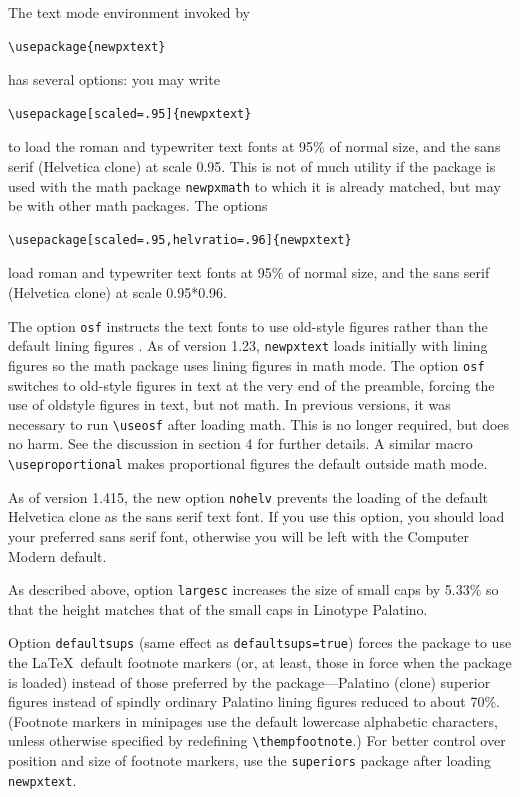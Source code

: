 \documentclass[11pt]{article}
\theoremstyle{oldplain}
\theoremstyle{plain}
\begin{document}
The text mode environment invoked by
\begin{verbatim}
\usepackage{newpxtext}
\end{verbatim}
has several options: you may write
\begin{verbatim}
\usepackage[scaled=.95]{newpxtext}
\end{verbatim}
to load the roman and typewriter text fonts at 95\% of normal size, and the sans serif (\textsf{Helvetica} clone) at scale 0.95. This is not of much utility if the package is used with the math package {\tt newpxmath} to which it is already matched, but may be with other math packages. The options
\begin{verbatim}
\usepackage[scaled=.95,helvratio=.96]{newpxtext}
\end{verbatim}
load roman and typewriter text fonts at 95\% of normal size, and the sans serif (\textsf{Helvetica} clone) at scale 0.95*0.96.

The option \texttt{osf} instructs the text fonts to use old-style figures  rather than the default lining figures . As of version 1.23, {\tt newpxtext} loads initially with lining figures so the math package uses lining figures in math mode. The option {\tt osf} switches to old-style figures in text at the very end of the preamble, forcing the use of oldstyle figures in text, but not math. In previous versions, it was necessary to run 
\verb|\useosf| after loading math. This is no longer required, but does no harm. See the discussion in section 4 for further details. A similar macro \verb|\useproportional| makes proportional figures the default outside math mode. 

As of version 1.415, the new option {\tt nohelv} prevents the loading of the default Helvetica clone as the sans serif text font. If you use this option, you should load your preferred sans serif font, otherwise you will be left with the Computer Modern default.

As described above, option {\tt largesc} increases the size of small caps by  5.33\% so that the height matches that of the small caps in Linotype Palatino.

Option {\tt defaultsups} (same effect as {\tt defaultsups=true}) forces the package to use the \LaTeX\ default footnote markers (or, at least, those in force when the package is loaded) instead of those preferred by the package---Palatino (clone) superior figures instead of spindly ordinary Palatino lining figures reduced to about 70\%. (Footnote markers in minipages use the default lowercase alphabetic characters, unless otherwise specified by redefining \verb|\thempfootnote|.) For better control over position and size of footnote markers, use the {\tt superiors} package after loading {\tt newpxtext}. 
\end{document}
